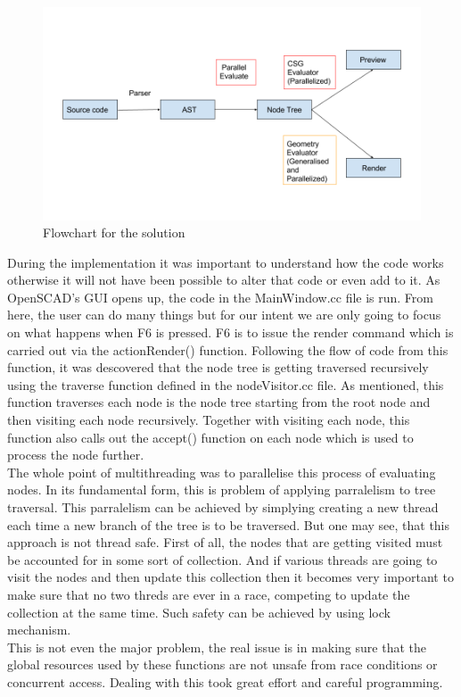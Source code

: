 \begin{figure}[H]
    \centering 
    \includegraphics[width=\linewidth]{images/finalflow.png}
    \caption{Flowchart for the solution}
\end{figure}
During the implementation it was important to understand how the code works otherwise it will not have been possible to alter that code or even add to it. As OpenSCAD's GUI opens up, the code in the MainWindow.cc file is run. From here, the user can do many things but for our intent we are only going to focus on what happens when F6 is pressed. F6 is to issue the render command which is carried out via the actionRender() function. Following the flow of code from this function, it was descovered that the node tree is getting traversed recursively using the traverse function defined in the nodeVisitor.cc file. As mentioned, this function traverses each node is the node tree starting from the root node and then visiting each node recursively. Together with visiting each node, this function also calls out the accept() function on each node which is used to process the node further.\\
The whole point of multithreading was to parallelise this process of evaluating nodes. In its fundamental form, this is problem of applying parralelism to tree traversal. This parralelism can be achieved by simplying creating a new thread each time a new branch of the tree is to be traversed. But one may see, that this approach is not thread safe. First of all, the nodes that are getting visited must be accounted for in some sort of collection. And if various threads are going to visit the nodes and then update this collection then it becomes very important to make sure that no two threds are ever in a race, competing to update the collection at the same time. Such safety can be achieved by using lock mechanism.\\
This is not even the major problem, the real issue is in making sure that the global resources used by these functions are not unsafe from race conditions or concurrent access. Dealing with this took great effort and careful programming.
